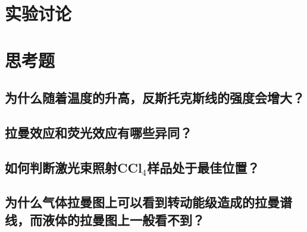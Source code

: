 \documentclass[a4paper]{article}
\begin{document}
\section{实验讨论}

\section{思考题}
\subsection{为什么随着温度的升高，反斯托克斯线的强度会增大？}
\subsection{拉曼效应和荧光效应有哪些异同？}
\subsection{如何判断激光束照射CCl$_4$样品处于最佳位置？}
\subsection{为什么气体拉曼图上可以看到转动能级造成的拉曼谱线，而液体的拉曼图上一般看不到？}

\nocite{jiaocai}

\end{document}
